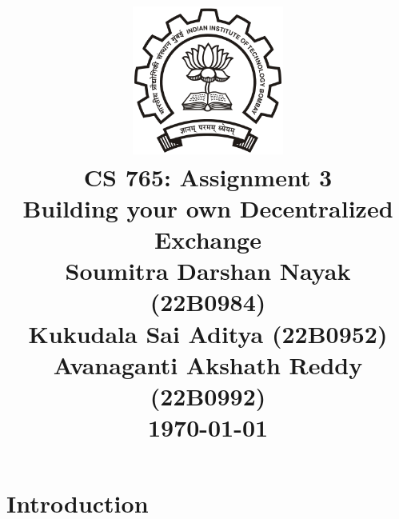\documentclass[12pt]{article}
\title{
    \includegraphics[width=5cm]{iitblogo.png} \\
    \vspace{2cm}
    \textbf{CS 765: Assignment 3} \\
    \vspace{0.2cm}
    \LARGE Building your own Decentralized Exchange\\
    \vspace{2cm}
    \Large Soumitra Darshan Nayak  (22B0984) \\ Kukudala Sai Aditya (22B0952)\\ Avanaganti Akshath Reddy (22B0992)\\
    \vspace{1cm}
    \large \today
}
\date{}
\begin{document}
\maketitle
\thispagestyle{empty}
\newpage

\section*{Introduction}
\end{document}
